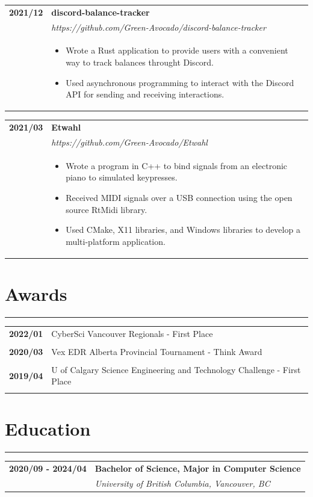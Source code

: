 \documentclass[letterpaper]{article}
\newcommand{\sect}[1]{\section*{#1}
                        {\color{cyan}
                        \rule{\textwidth}{1pt}
                        \vspace{-1ex}}}
\begin{document}
        \begin{tabular}{p{} p{}}
            \textbf{2021/12} & \textbf{discord-balance-tracker} \\
            & \emph{https://github.com/Green-Avocado/discord-balance-tracker} \\
            & \begin{itemize}
                \item Wrote a Rust application to provide users with a convenient way to track balances
                    throught Discord.
                \item Used asynchronous programming to interact with the Discord API for sending and
                    receiving interactions.
            \end{itemize}
            \\
        \end{tabular}

        \begin{tabular}{p{} p{}}
            \textbf{2021/03} & \textbf{Etwahl} \\
            & \emph{https://github.com/Green-Avocado/Etwahl} \\
            & \begin{itemize}
                \item Wrote a program in C++ to bind signals from an electronic piano to simulated
                    keypresses.
                \item Received MIDI signals over a USB connection using the open source RtMidi library.
                \item Used CMake, X11 libraries, and Windows libraries to develop a multi-platform
                    application.
            \end{itemize}
            \\
        \end{tabular}

    \sect{Awards}

        \begin{tabular}{p{} p{}}
            \textbf{2022/01} & CyberSci Vancouver Regionals - First Place \\
            \\
            \textbf{2020/03} & Vex EDR Alberta Provincial Tournament - Think Award \\
            \\
            \textbf{2019/04} & U of Calgary Science Engineering and Technology Challenge - First Place \\
            \\
        \end{tabular}

    \sect{Education}

        \begin{tabular}{p{} p{}}
            \textbf{2020/09 - 2024/04} & \large\textbf{Bachelor of Science, Major in Computer Science} \\
            & \emph{University of British Columbia, Vancouver, BC} \\
        \end{tabular}
\end{document}
